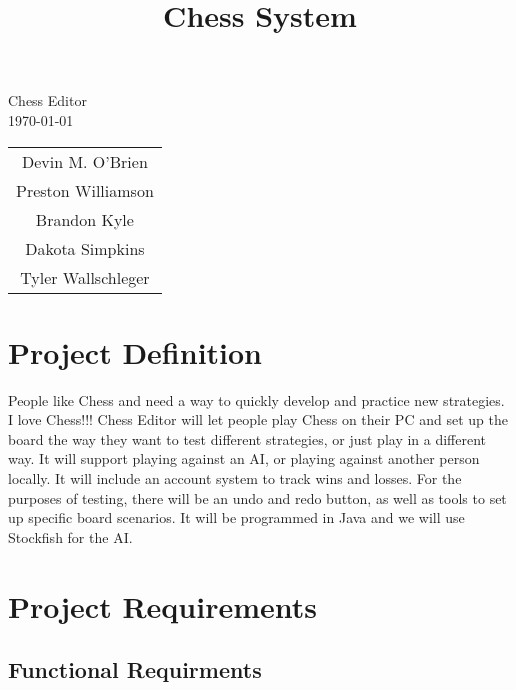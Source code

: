 \documentclass{article}
\title{Chess System}
\begin{document}
\begin{titlepage}
\begin{center}
\vspace{1cm}
\huge Chess Editor\\
\normalsize
\vspace{1cm}
\today\\
\vspace{1cm}
\begin{tabular}{c}
Devin M. O'Brien \\
Preston Williamson\\
Brandon Kyle\\
Dakota Simpkins\\
Tyler Wallschleger
\end{tabular}
\end{center}
\end{titlepage}
\section{Project Definition}
People like Chess and need a way to quickly develop and practice new strategies. I love
Chess!!! Chess Editor will let people play Chess on their PC and set up the board the
way they want to test different strategies, or just play in a different way. It will support
playing against an AI, or playing against another person locally. It will include an account
system to track wins and losses. For the purposes of testing, there will be an undo and
redo button, as well as tools to set up specific board scenarios. It will be programmed in
Java and we will use Stockfish for the AI.
\newpage
\section{Project Requirements}

\subsection{Functional Requirments}
\end{document}
